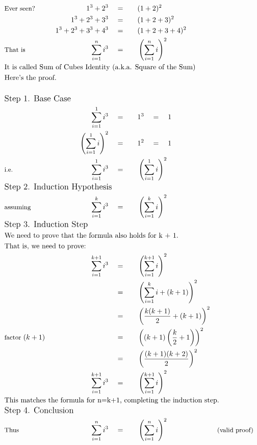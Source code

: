 \begin{alignat*}{5}
&\small\text{Ever seen?}\qquad&1^3+2^3\quad&=\quad&&(1+2)^2\\
&\,&1^3+2^3+3^3\quad&=&&(1+2+3)^2\\
&\,&1^3+2^3+3^3+4^3\quad&=&&(1+2+3+4)^2\\
&\small\text{That is}&\sum_{i=1}^{n}i^3\quad&=&&\left(\sum_{i=1}^{n}i\right)^2\\
&\rlap{\text{It is called Sum of Cubes Identity (a.k.a. Square of the Sum)}}\\
&\rlap{\text{Here's the proof.}}\\ \\
&\rlap{\large\text{Step 1. Base Case}}\\
&\,&\sum_{i=1}^{1}i^3\quad&=&&1^3\quad=\quad1\\
&\,&\left(\sum_{i=1}^{1}i\right)^2\quad&=&&1^2\quad=\quad1\\
&\small\text{i.e.}&\sum_{i=1}^{1}i^3\quad&=&&\left(\sum_{i=1}^{1}i\right)^2\\
&\rlap{\large\text{Step 2. Induction Hypothesis}}\\
&\small\text{assuming}&\sum_{i=1}^{k}i^3\quad&=&&\left(\sum_{i=1}^{k}i\right)^2\\
&\rlap{\large\text{Step 3. Induction Step}}\\
&\rlap{\text{We need to prove that the formula also holds for k + 1.}}\\
&\rlap{\text{That is, we need to prove:}}\\
&\,&\sum_{i=1}^{k+1}i^3\quad&=&&\left(\sum_{i=1}^{k+1}i\right)^2\\
&\,&\,&=&&\left(\sum_{i=1}^{k}i+(k+1)\right)^2\\
&\,&\,&=&&\left(\frac{k(k+1)}{2}+(k+1)\right)^2\\
&\small\text{factor }(k+1)&\,&=&&\left((k+1)\left(\frac{k}{2}+1\right)\right)^2\\
&\,&\,&=&&\left(\frac{(k+1)(k+2)}{2}\right)^2\\
&\,&\sum_{i=1}^{k+1}i^3\quad&=&&\left(\sum_{i=1}^{k+1}i\right)^2\\
&\rlap{\text{This matches the formula for }n=k+1\text{, completing the induction step.}}\\
&\rlap{\large\text{Step 4. Conclusion}}\\
&\small\text{Thus}&\sum_{i=1}^{n}i^3\quad&=&&\left(\sum_{i=1}^{n}i\right)^2\qquad&&\small\text{(valid proof)}\\
\end{alignat*}
